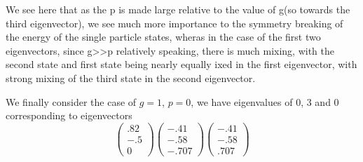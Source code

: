 \documentclass[11pt]{article} %
\begin{document}
We see here that as the p is made large relative to the value of g(so towards the third eigenvector), we see much more importance to the symmetry breaking of the energy of the single particle states, wheras in the case of the first two eigenvectors, since g>>p relatively speaking, there is much mixing, with the second state and first state being nearly equally ixed in the first eigenvector, with strong mixing of the third state in the second eigenvector. 


We finally consider the case of $g=1$, $p=0$, we have eigenvalues of $0$, $3$ and $0$ corresponding to eigenvectors\\

\begin{equation}
\left( \begin{matrix} .82 \\ -.5 \\0 \end{matrix} \right)
\left( \begin{matrix} -.41 \\ -.58 \\ -.707 \end{matrix} \right)
\left( \begin{matrix} -.41 \\ -.58 \\ .707 \end{matrix} \right)
\end{equation}
\end{document}
